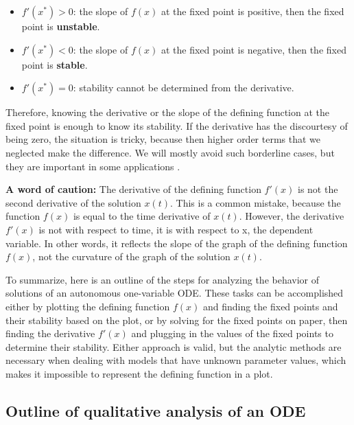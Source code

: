 \documentclass[
  letterpaper,
  DIV=11,
  numbers=noendperiod]{scrreprt}
\providecommand{\tightlist}{%
  \setlength{\itemsep}{0pt}\setlength{\parskip}{0pt}}\usepackage{longtable,booktabs,array}
\begin{document}
\begin{itemize}
\tightlist
\item
  \(f'(x^*) > 0\): the slope of \(f(x)\) at the fixed point is positive,
  then the fixed point is \textbf{unstable}.
\item
  \(f'(x^*) < 0\): the slope of \(f(x)\) at the fixed point is negative,
  then the fixed point is \textbf{stable}.
\item
  \(f'(x^*) = 0\): stability cannot be determined from the derivative.
\end{itemize}

Therefore, knowing the derivative or the slope of the defining function
at the fixed point is enough to know its stability. If the derivative
has the discourtesy of being zero, the situation is tricky, because then
higher order terms that we neglected make the difference. We will mostly
avoid such borderline cases, but they are important in some applications
\cite{strogatz_nonlinear_2001}.

\textbf{A word of caution:} The derivative of the defining function
\(f'(x)\) is not the second derivative of the solution \(x(t)\). This is
a common mistake, because the function \(f(x)\) is equal to the time
derivative of \(x(t)\). However, the derivative \(f'(x)\) is not with
respect to time, it is with respect to x, the dependent variable. In
other words, it reflects the slope of the graph of the defining function
\(f(x)\), not the curvature of the graph of the solution \(x(t)\).

To summarize, here is an outline of the steps for analyzing the behavior
of solutions of an autonomous one-variable ODE. These tasks can be
accomplished either by plotting the defining function \(f(x)\) and
finding the fixed points and their stability based on the plot, or by
solving for the fixed points on paper, then finding the derivative
\(f'(x)\) and plugging in the values of the fixed points to determine
their stability. Either approach is valid, but the analytic methods are
necessary when dealing with models that have unknown parameter values,
which makes it impossible to represent the defining function in a plot.

\hypertarget{outline-of-qualitative-analysis-of-an-ode}{%
\subsection{Outline of qualitative analysis of an
ODE}\label{outline-of-qualitative-analysis-of-an-ode}}
\end{document}
